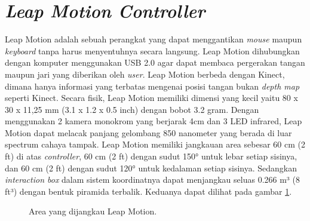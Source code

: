 \section{\textit{Leap Motion Controller}}
\vspace{1ex}
	Leap Motion adalah sebuah perangkat yang dapat menggantikan \textit{mouse} maupun \textit{keyboard} tanpa harus menyentuhnya secara langsung. Leap Motion dihubungkan dengan komputer menggunakan USB 2.0  agar dapat membaca pergerakan tangan maupun jari yang diberikan oleh \textit{user}. Leap Motion berbeda dengan Kinect, dimana hanya informasi yang terbatas mengenai posisi tangan bukan \textit{depth map} seperti Kinect\cite{naidu2016hand}. Secara fisik, Leap Motion memiliki dimensi yang kecil yaitu 80 x 30 x 11,25 mm (3.1 x 1.2 x 0.5 inch) dengan bobot 3.2 gram. Dengan menggunakan 2 kamera monokrom yang berjarak 4cm dan 3 LED infrared, Leap Motion dapat melacak panjang gelombang 850 nanometer yang berada di luar spectrum cahaya tampak. Leap Motion memiliki jangkauan area sebesar 60 cm (2 ft) di atas \textit{controller}, 60 cm (2 ft) dengan sudut 150° untuk lebar setiap sisinya, dan 60 cm (2 ft) dengan sudut 120° untuk kedalaman setiap sisinya. Sedangkan \textit{interaction box} dalam sistem koordinatnya dapat menjangkau seluas 0.266 m³ (8 ft³) dengan bentuk piramida terbalik\cite{leapmotion_ds}. Keduanya dapat dilihat pada gambar \ref{fig:lm_int}.
	\begin{figure} [H]
		\hspace{0.1em}
		\caption{Area yang dijangkau Leap Motion.}
		\label{fig:lm_int}
	\end{figure}

